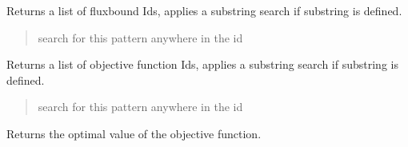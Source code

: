 \documentclass[letterpaper,12pt,english]{sphinxmanual}
\begin{document}
\begin{fulllineitems}

\begin{fulllineitems}
\label{\detokenize{api/core:cbmpy.CBModel.Model.getFluxBoundIds}}
\pysigstartsignatures
\pysiglinewithargsret
{}
{}
{}
\pysigstopsignatures
\sphinxAtStartPar
Returns a list of fluxbound Ids, applies a substring search if substring is defined.
\begin{quote}\begin{description}
\sphinxAtStartPar
{} \textendash{} search for this pattern anywhere in the id

\end{description}\end{quote}

\end{fulllineitems}


\begin{fulllineitems}
\label{\detokenize{api/core:cbmpy.CBModel.Model.getObjectiveIds}}
\pysigstartsignatures
\pysiglinewithargsret
{}
{}
{}
\pysigstopsignatures
\sphinxAtStartPar
Returns a list of objective function Ids, applies a substring search if substring is defined.
\begin{quote}\begin{description}
\sphinxAtStartPar
{} \textendash{} search for this pattern anywhere in the id

\end{description}\end{quote}

\end{fulllineitems}


\begin{fulllineitems}
\label{\detokenize{api/core:cbmpy.CBModel.Model.getOptimalValue}}
\pysigstartsignatures
\pysiglinewithargsret
{}
{}
{}
\pysigstopsignatures
\sphinxAtStartPar
Returns the optimal value of the objective function.


\end{fulllineitems}
\end{fulllineitems}
\end{document}
